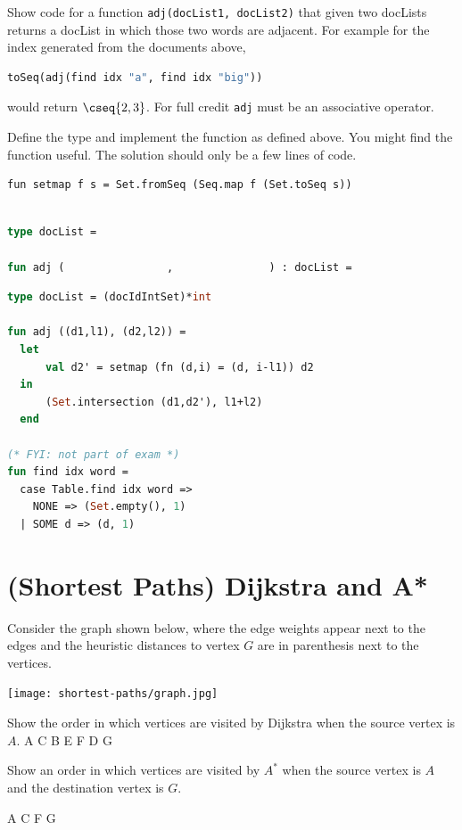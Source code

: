 \begin{problem}%

Show code for a function \texttt{adj(docList1, docList2)} that given
two docLists returns a docList in which those two words
are adjacent.  For example for the index generated from the documents
above, 
\begin{lstlisting}[language=ocaml,numbers=none]
toSeq(adj(find idx "a", find idx "big")) 
\end{lstlisting}
would return
$\cseq{2, 3}$.  For full credit \texttt{adj} must be an associative operator.

\ask
Define the  type and implement the function  as defined above.
You might find the function  useful. The solution should
only be a few lines of code.
\begin{lstlisting}[numbers=none]
fun setmap f s = Set.fromSeq (Seq.map f (Set.toSeq s)) 
\end{lstlisting}


\begin{lstlisting}[language=ocaml,numbers=none]

type docList = 

fun adj (                ,               ) : docList =

\end{lstlisting}


\sol
\begin{lstlisting}[language=ocaml,numbers=none]
type docList = (docIdIntSet)*int

fun adj ((d1,l1), (d2,l2)) = 
  let 
      val d2' = setmap (fn (d,i) = (d, i-l1)) d2
  in  
      (Set.intersection (d1,d2'), l1+l2)
  end

(* FYI: not part of exam *)
fun find idx word = 
  case Table.find idx word =>
    NONE => (Set.empty(), 1)
  | SOME d => (d, 1)
\end{lstlisting}
   
\end{problem}


\section{(Shortest Paths) Dijkstra and A*}
%


\begin{problem}[6.]

Consider the graph shown below, where the edge weights appear next to
the edges and the heuristic distances to vertex $G$ are in parenthesis
next to the vertices.
\begin{center}
  \texttt{[image: shortest-paths/graph.jpg]}
\end{center}

\ask
Show the order in which vertices are visited by Dijkstra when the source
vertex is $A$.
\sol
A C B E F D G


\ask Show an order in which vertices are visited by $A^*$ when
the source vertex is $A$ and the destination vertex is $G$.

\sol
A C F G 

\end{problem}

